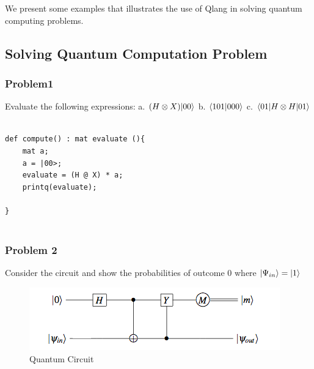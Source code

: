 We present some examples that illustrates the use of Qlang in solving quantum computing problems.

\subsection { Solving Quantum Computation Problem}
\subsubsection{Problem1}
Evaluate the following expressions: a. $(H \otimes X) |00\rangle$ b. $\dotproduct[101,000]$ c. $\langle 01| H \otimes H |01\rangle $
\begin{lstlisting}
	
def compute() : mat evaluate (){
	mat a;
	a = |00>;
	evaluate = (H @ X) * a;	
	printq(evaluate);
				
}
	
\end{lstlisting}

\subsubsection{Problem 2}
Consider the circuit and show the probabilities of outcome 0 where $|\Psi_{in}\rangle = |1\rangle$
\begin{figure}[h!]
\begin{center}
\includegraphics{ref/circuit2}
\end{center}
\caption{ Quantum Circuit\label{cir1}}
\end{figure}


